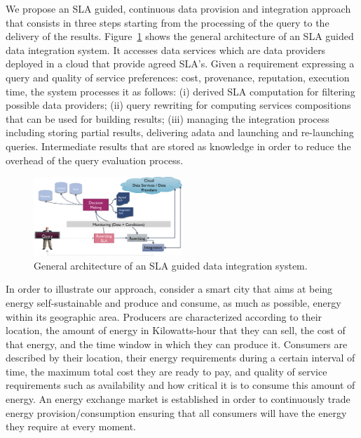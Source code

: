 We propose an SLA guided, continuous data provision and integration approach that consists in three steps  starting from the processing of the query  to the delivery of the results.
Figure~\ref{fig:arch} shows the general architecture of an SLA guided data integration system. It accesses data services which are data providers deployed in a cloud  that provide agreed SLA’s. 
Given a requirement expressing a query and quality of service preferences: cost, provenance, reputation, execution time, the system processes it  as follows: (i) derived SLA  computation for filtering possible data providers; (ii) query rewriting for computing services compositions that can be used for building results; (iii) managing the integration process including storing partial results, delivering adata and launching and re-launching queries. Intermediate results that are stored as knowledge in order to reduce the overhead of the query evaluation process. 


\begin{figure}
\includegraphics[width=0.5\textwidth]{figs/arch.png}
\caption{General architecture of an SLA guided  data integration system.\label{fig:arch}}
\end{figure}

In order to illustrate our approach, consider a smart city that aims at being energy self-sustainable and produce and consume, as much as possible, energy within its geographic area. 
Producers are characterized according to their location, the amount of energy in Kilowatts-hour that they can sell, the cost of that energy, and the time window in which they can produce it. 
Consumers are described by their location, their energy requirements during a certain interval of time, the maximum total cost they are ready to pay, and quality of service requirements such as availability and how critical it is to consume this amount of energy. 
An energy exchange market is established in order to continuously trade  energy provision/consumption ensuring that all consumers will have the energy they require at every moment.




